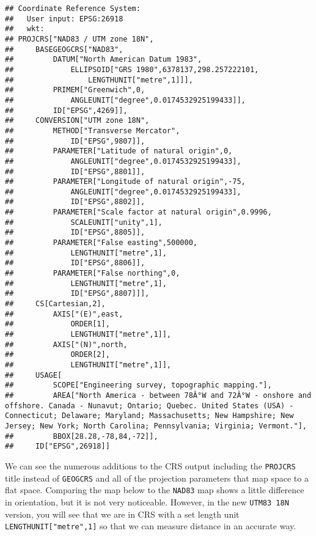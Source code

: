 \documentclass[
]{article}
\begin{document}
\begin{verbatim}
## Coordinate Reference System:
##   User input: EPSG:26918 
##   wkt:
## PROJCRS["NAD83 / UTM zone 18N",
##     BASEGEOGCRS["NAD83",
##         DATUM["North American Datum 1983",
##             ELLIPSOID["GRS 1980",6378137,298.257222101,
##                 LENGTHUNIT["metre",1]]],
##         PRIMEM["Greenwich",0,
##             ANGLEUNIT["degree",0.0174532925199433]],
##         ID["EPSG",4269]],
##     CONVERSION["UTM zone 18N",
##         METHOD["Transverse Mercator",
##             ID["EPSG",9807]],
##         PARAMETER["Latitude of natural origin",0,
##             ANGLEUNIT["degree",0.0174532925199433],
##             ID["EPSG",8801]],
##         PARAMETER["Longitude of natural origin",-75,
##             ANGLEUNIT["degree",0.0174532925199433],
##             ID["EPSG",8802]],
##         PARAMETER["Scale factor at natural origin",0.9996,
##             SCALEUNIT["unity",1],
##             ID["EPSG",8805]],
##         PARAMETER["False easting",500000,
##             LENGTHUNIT["metre",1],
##             ID["EPSG",8806]],
##         PARAMETER["False northing",0,
##             LENGTHUNIT["metre",1],
##             ID["EPSG",8807]]],
##     CS[Cartesian,2],
##         AXIS["(E)",east,
##             ORDER[1],
##             LENGTHUNIT["metre",1]],
##         AXIS["(N)",north,
##             ORDER[2],
##             LENGTHUNIT["metre",1]],
##     USAGE[
##         SCOPE["Engineering survey, topographic mapping."],
##         AREA["North America - between 78Â°W and 72Â°W - onshore and offshore. Canada - Nunavut; Ontario; Quebec. United States (USA) - Connecticut; Delaware; Maryland; Massachusetts; New Hampshire; New Jersey; New York; North Carolina; Pennsylvania; Virginia; Vermont."],
##         BBOX[28.28,-78,84,-72]],
##     ID["EPSG",26918]]
\end{verbatim}

We can see the numerous additions to the CRS output including the
\texttt{PROJCRS} title instead of \texttt{GEOGCRS} and all of the
projection parameters that map space to a flat space. Comparing the map
below to the \texttt{NAD83} map shows a little difference in
orientation, but it is not very noticeable. However, in the new
\texttt{UTM83\ 18N} version, you will see that we are in CRS with a set
length unit \texttt{LENGTHUNIT{[}"metre",1{]}} so that we can measure
distance in an accurate way.
\end{document}
